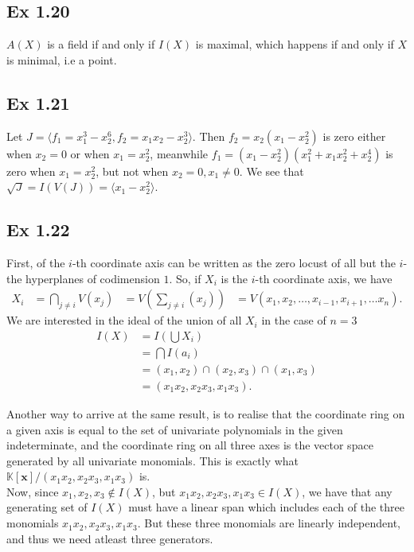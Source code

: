 \documentclass{article}
\theoremstyle{definition}
\newcommand{\K}{\mathbb{K}}
\newcommand{\Kx}{\K[\bm{x}]}
\begin{document}
\subsection*{Ex 1.20}
$A(X)$ is a field if and only if $I(X)$ is maximal, which happens if and only
if $X$ is minimal, i.e a point.

\subsection*{Ex 1.21}
Let $J = \langle f_1 = x_1^{3} - x_2^{6}, f_2 = x_1x_2 - x_2^{3}\rangle$. Then
$f_2 = x_2(x_1 - x_2^{2})$ is zero either when $x_2 = 0$ or when $x_1 =
x_2^{2}$, meanwhile $f_1 = (x_1 - x_2^{2})(x_1^{2} + x_1x_2^{2} + x_2^{4})$ is
zero when $x_1 = x_2^{2}$, but not when $x_2 = 0, x_1 \not = 0$.
We see that $\sqrt{J} = I(V(J)) = \langle x_1 - x_2^{2} \rangle$.

\subsection*{Ex 1.22}
First, of the $i$-th coordinate axis can be written as the zero locust
of all but the $i$-the hyperplanes of codimension $1$. So, if $X_i$
is the $i$-th coordinate axis, we have
\begin{align*}
	X_i 
	&=
	\bigcap_{j \not = i} V(x_j)
	&=
	V\left(\sum_{j \not = i} (x_j)\right)
	&=
	V(x_1, x_2, \ldots, x_{i- 1}, x_{i + 1}, \ldots x_n).
\end{align*}
We are interested in the ideal of the union of all $X_i$ in the case of $n = 3$
\begin{align*}
	I(X)
	&=
	I\left(\bigcup X_i\right) \\
	&=
	\bigcap I(a_i) \\
	&=
	(x_1, x_2) \cap (x_2, x_3) \cap (x_1, x_3)\\
	&=
	(x_1x_2, x_2x_3, x_1x_3).
\end{align*} 

Another way to arrive at the same result, is to realise that the coordinate
ring on a given axis is equal to the set of univariate polynomials in the given
indeterminate, and the coordinate ring on all three axes is the vector space
generated by all univariate monomials. This is exactly what $\Kx / (x_1x_2,
x_2x_3, x_1x_3)$ is. \\

Now, since $x_1, x_2, x_3 \not \in I(X)$, but $x_1x_2, x_2x_3, x_1x_3 \in
I(X)$, we have that any generating set of $I(X)$ must have a linear span which
includes each of the three monomials $x_1x_2, x_2x_3, x_1x_3$. But these three
monomials are linearly independent, and thus we need atleast three generators.
\end{document}
